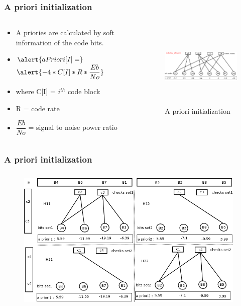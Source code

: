 \documentclass[xcolor=dvipsname]
{beamer}
\begin{document}
\begin{frame}[t]
\frametitle{ A priori initialization }  
\begin{columns}[totalwidth=\textwidth]
	\begin{column}{0.4\textwidth}
	\centering
	\begin{itemize}
	\item A priories are calculated by soft information of the code bits.	
	\item 	$
	\alert{aPriori[I] =}
	$
	$
	\alert{ -4 * C[I] * R * \dfrac{Eb}{No}}
	$ 
	\item where C[I] = $i^{th}$ code block
	\item R = code rate
	\item $\dfrac{Eb}{No}$ = signal to noise power ratio
	\end{itemize}
 
			
	\end{column}%
	   		
	\begin{column}{0.6\textwidth}
	\centering
	\begin{figure}
	\includegraphics[height=4cm,width=7cm]{minSum2}
	\caption{ A priori initialization }
	\end{figure}
	\end{column}%
\end{columns}
\end{frame}


\begin{frame}[t]
\frametitle{ A priori initialization }  
\vspace{-5mm}
\begin{figure}
       \includegraphics[height=7cm,width=11cm]{minSumModified1}
       \end{figure}
\end{frame}
\end{document}
